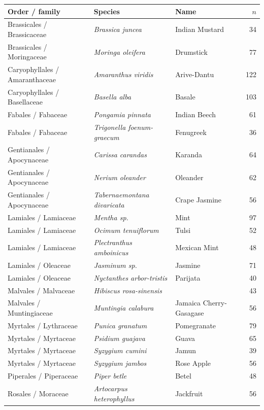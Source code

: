 \begin{tabular}{lllr}
\toprule
Order / family & Species & Name & $n$ \\
\midrule
Brassicales / Brassicaceae & \textit{Brassica juncea} & Indian Mustard & 34 \\
Brassicales / Moringaceae & \textit{Moringa oleifera} & Drumstick & 77 \\
Caryophyllales / Amaranthaceae & \textit{Amaranthus viridis} & Arive-Dantu & 122 \\
Caryophyllales / Basellaceae & \textit{Basella alba} & Basale & 103 \\
Fabales / Fabaceae & \textit{Pongamia pinnata} & Indian Beech & 61 \\
Fabales / Fabaceae & \textit{Trigonella foenum-graecum} & Fenugreek & 36 \\
Gentianales / Apocynaceae & \textit{Carissa carandas} & Karanda & 64 \\
Gentianales / Apocynaceae & \textit{Nerium oleander} & Oleander & 62 \\
Gentianales / Apocynaceae & \textit{Tabernaemontana divaricata} & Crape Jasmine & 56 \\
Lamiales / Lamiaceae & \textit{Mentha sp.} & Mint & 97 \\
Lamiales / Lamiaceae & \textit{Ocimum tenuiflorum} & Tulsi & 52 \\
Lamiales / Lamiaceae & \textit{Plectranthus amboinicus} & Mexican Mint & 48 \\
Lamiales / Oleaceae & \textit{Jasminum sp.} & Jasmine & 71 \\
Lamiales / Oleaceae & \textit{Nyctanthes arbor-tristis} & Parijata & 40 \\
Malvales / Malvaceae & \textit{Hibiscus rosa-sinensis} &  & 43 \\
Malvales / Muntingiaceae & \textit{Muntingia calabura} & Jamaica Cherry-Gasagase & 56 \\
Myrtales / Lythraceae & \textit{Punica granatum} & Pomegranate & 79 \\
Myrtales / Myrtaceae & \textit{Psidium guajava} & Guava & 65 \\
Myrtales / Myrtaceae & \textit{Syzygium cumini} & Jamun & 39 \\
Myrtales / Myrtaceae & \textit{Syzygium jambos} & Rose Apple & 56 \\
Piperales / Piperaceae & \textit{Piper betle} & Betel & 48 \\
Rosales / Moraceae & \textit{Artocarpus heterophyllus} & Jackfruit & 56 \\

\end{tabular}

